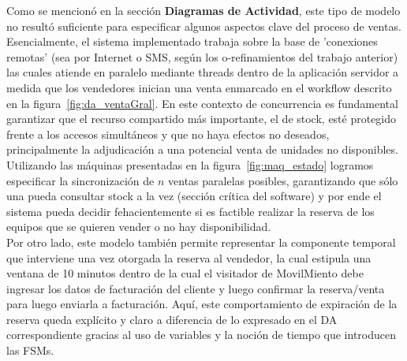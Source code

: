 Como se mencionó en la sección \textbf{Diagramas de Actividad}, este tipo de modelo no resultó suficiente para especificar algunos aspectos clave del proceso de ventas. Esencialmente, el sistema implementado trabaja sobre la base de 'conexiones remotas' (sea por Internet o SMS, según los o-refinamientos del trabajo anterior) las cuales atiende en paralelo mediante threads dentro de la aplicación servidor a medida que los vendedores inician una venta enmarcado en el workflow descrito en la figura~\ref{fig:da_ventaGral}. En este contexto de concurrencia es fundamental garantizar que el recurso compartido más importante, el de stock, esté protegido frente a los accesos simultáneos y que no haya efectos no deseados, principalmente la adjudicación a una potencial venta de unidades no disponibles. Utilizando las máquinas presentadas en la figura~\ref{fig:maq_estado} logramos especificar la sincronización de $n$ ventas paralelas posibles, garantizando que sólo una pueda consultar stock a la vez (sección crítica del software) y por ende el sistema pueda decidir fehacientemente si es factible realizar la reserva de los equipos que se quieren vender o no hay disponibilidad.\\
\indent Por otro lado, este modelo también permite representar la componente temporal que interviene una vez otorgada la reserva al vendedor, la cual estipula una ventana de 10 minutos dentro de la cual el visitador de MovilMiento debe ingresar los datos de facturación del cliente y luego confirmar la reserva/venta para luego enviarla a facturación. Aquí, este comportamiento de expiración de la reserva queda explícito y claro a diferencia de lo expresado en el DA correspondiente gracias al uso de variables y la noción de tiempo que introducen las FSMs.


